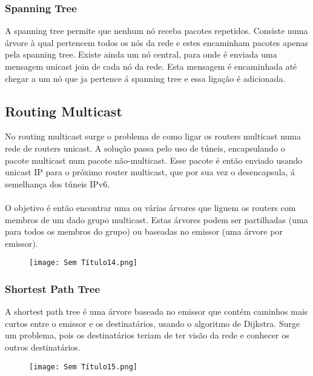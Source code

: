 \documentclass[10pt,a4paper]{report}
\begin{document}
\subsubsection{Spanning Tree}
A spanning tree permite que nenhum nó receba pacotes repetidos. Consiste numa árvore à qual pertencem todos os nós da rede e estes encaminham pacotes apenas pela spanning tree. Existe ainda um nó central, para onde é enviada uma mensagem unicast join de cada nó da rede. Esta mensagem é encaminhada até chegar a um nó que ja pertence á spanning tree e essa ligação é adicionada.
\subsection{Routing Multicast}
No routing multicast surge o problema de como ligar os routers multicast numa rede de routers unicast. A solução passa pelo uso de túneis, encapsulando o pacote multicast num pacote não-multicast. Esse pacote é então enviado usando unicast IP para o próximo router multicast, que por sua vez o desencapsula, á semelhança dos túneis IPv6.\\
\\
O objetivo é então encontrar uma ou várias árvores que liguem os routers com membros de um dado grupo multicast. Estas árvores podem ser partilhadas (uma para todos os membros do grupo) ou baseadas no emissor (uma árvore por emissor).
\begin{figure}[H]
\centering
\texttt{[image: Sem Título14.png]}
\end{figure}
\subsubsection{Shortest Path Tree}
A shortest path tree é uma árvore baseada no emissor que contém caminhos mais curtos entre o emissor e os destinatários, usando o algoritmo de Dijkstra. Surge um problema, pois os destinatários teriam de ter visão da rede e conhecer os outros destinatários.
\begin{figure}[H]
\centering
\texttt{[image: Sem Título15.png]}
\end{figure}
\end{document}
